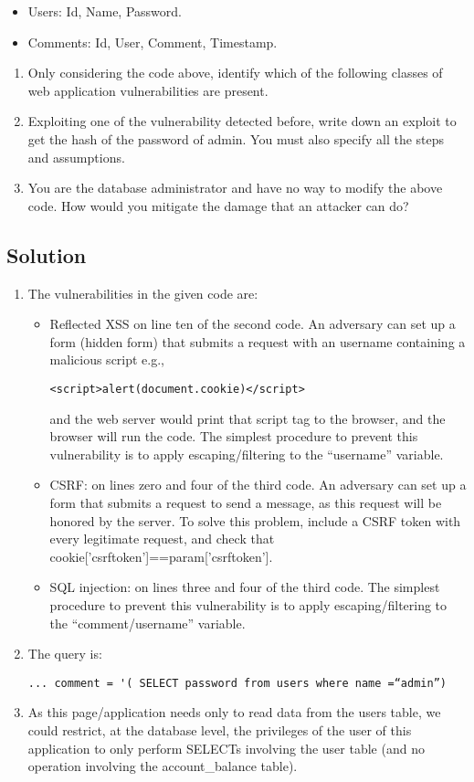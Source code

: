 \begin{itemize}
    \item Users: Id, Name, Password. 
    \item Comments: Id, User, Comment, Timestamp.
\end{itemize}
\begin{enumerate}
    \item Only considering the code above, identify which of the following classes of web application vulnerabilities are present. 
    \item Exploiting one of the vulnerability detected before, write down an exploit to get the hash of the password of admin. 
        You must also specify all the steps and assumptions.
    \item You are the database administrator and have no way to modify the above code. 
        How would you mitigate the damage that an attacker can do?
\end{enumerate}

\subsection*{Solution}
\begin{enumerate}
    \item The vulnerabilities in the given code are: 
        \begin{itemize}
            \item Reflected XSS on line ten of the second code. 
                An adversary can set up a form (hidden form) that submits a request with an username containing a malicious script e.g.,
\begin{verbatim}
<script>alert(document.cookie)</script>
\end{verbatim}
                and the web server would print that script tag to the browser, and the browser will run the code.
                The simplest procedure to prevent this vulnerability is to apply escaping/filtering to the “username” variable. 
            \item CSRF: on lines zero and four of the third code. 
                An adversary can set up a form that submits a request to send a message, as this request will be honored by the server. 
                To solve this problem, include a CSRF token with every legitimate request, and check that cookie['csrftoken']==param['csrftoken']. 
            \item SQL injection: on lines three and four of the third code. 
                The simplest procedure to prevent this vulnerability is to apply escaping/filtering to the “comment/username” variable.
        \end{itemize}
    \item The query is: 
\begin{verbatim}
... comment = '( SELECT password from users where name =“admin”)
\end{verbatim}
    \item As this page/application needs only to read data from the users table, we could restrict, at the database level, the privileges of the user of this application to only perform SELECTs involving the user table (and no operation involving the account\_balance table).
\end{enumerate}